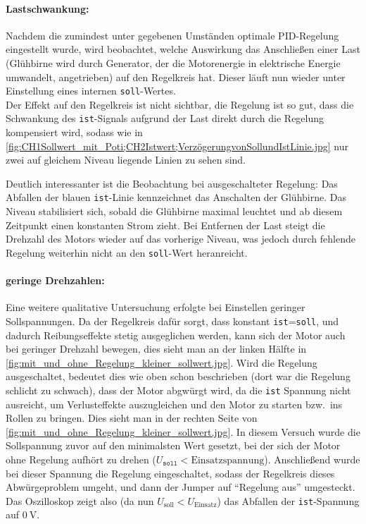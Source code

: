 \paragraph{Lastschwankung:} Nachdem die zumindest unter gegebenen Umständen optimale PID-Regelung eingestellt wurde, wird beobachtet, welche Auswirkung das Anschließen einer Last (Glühbirne wird durch Generator, der die Motorenergie in elektrische Energie umwandelt, angetrieben) auf den Regelkreis hat. Dieser läuft nun wieder unter Einstellung eines internen \verb|soll|-Wertes. \\
Der Effekt auf den Regelkreis ist nicht sichtbar, die Regelung ist so gut, dass die Schwankung des \verb|ist|-Signals aufgrund der Last direkt durch die Regelung kompensiert wird, sodass wie in \cref{fig:CH1Sollwert_mit_Poti;CH2Istwert;VerzögerungvonSollundIstLinie.jpg} nur zwei auf gleichem Niveau liegende Linien zu sehen sind. 

\clearpage
Deutlich interessanter ist die Beobachtung bei ausgeschalteter Regelung: 
\FloatBarrier
Das Abfallen der blauen \verb|ist|-Linie kennzeichnet das Anschalten der Glühbirne. Das Niveau stabilisiert sich, sobald die Glühbirne maximal leuchtet und ab diesem Zeitpunkt einen konstanten Strom zieht. Bei Entfernen der Last steigt die Drehzahl des Motors wieder auf das vorherige Niveau, was jedoch durch fehlende Regelung weiterhin nicht an den \verb|soll|-Wert heranreicht.

\paragraph{geringe Drehzahlen:} Eine weitere qualitative Untersuchung erfolgte bei Einstellen geringer Sollspannungen. Da der Regelkreis dafür sorgt, dass konstant \verb|ist|=\verb|soll|, und dadurch Reibungseffekte stetig ausgeglichen werden, kann sich der Motor auch bei geringer Drehzahl bewegen, dies sieht man an der linken Hälfte in \cref{fig:mit_und_ohne_Regelung_kleiner_sollwert.jpg}. Wird die Regelung ausgeschaltet, bedeutet dies wie oben schon beschrieben (dort war die Regelung schlicht zu schwach), dass der Motor abgwürgt wird, da die \verb|ist| Spannung nicht ausreicht, um Verlusteffekte auszugleichen und den Motor zu starten bzw.\ ins Rollen zu bringen. Dies sieht man in der rechten Seite von \cref{fig:mit_und_ohne_Regelung_kleiner_sollwert.jpg}. In diesem Versuch wurde die Sollspannung zuvor auf den minimalsten Wert gesetzt, bei der sich der Motor ohne Regelung aufhört zu drehen (\(U_{\texttt{soll}}<\text{Einsatzspannung}\)). Anschließend wurde bei dieser Spannung die Regelung eingeschaltet, sodass der Regelkreis dieses Abwürgeproblem umgeht, und dann der Jumper auf \enquote{Regelung aus} umgesteckt. Das Oszilloskop zeigt also (da nun \(U_{\text{soll}}<U_{\text{Einsatz}}\)) das Abfallen der \verb|ist|-Spannung auf \(\qty{0}{\volt}\). 

